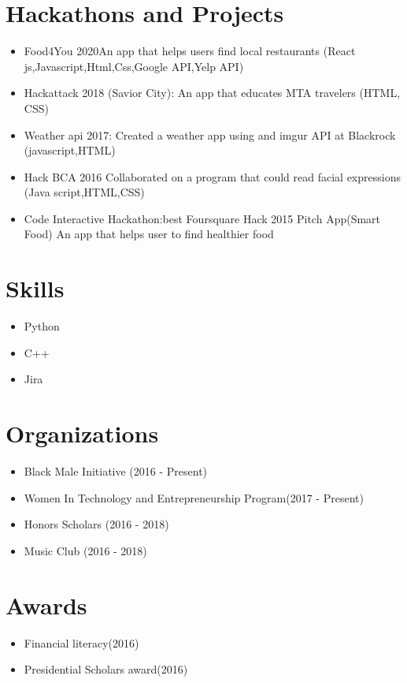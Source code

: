 \documentclass{article}
\begin{document}
\section{Hackathons and Projects}
\begin{itemize}
\item{ Food4You 2020}An app that helps users find local restaurants (React js,Javascript,Html,Css,Google API,Yelp API) 
\item {Hackattack 2018} {(Savior City): An app that educates MTA travelers (HTML, CSS)}
\item {Weather api 2017}: Created a weather app using and imgur API at Blackrock (javascript,HTML)
\item {Hack BCA 2016} {Collaborated on a program that could read facial expressions (Java script,HTML,CSS) } 
\item {Code Interactive Hackathon:best Foursquare Hack 2015}
 {Pitch App(Smart Food) An app that helps user to find healthier food} 
\end{itemize}

 \section{ Skills}
\begin{itemize}
\item{}Python    
\item C++ 
\item Jira 
\end{itemize}
\section{Organizations}
\begin{itemize}
\item Black Male Initiative (2016 - Present)
\item Women In Technology and Entrepreneurship Program(2017 - Present)
\item Honors Scholars (2016 - 2018)
\item  Music Club (2016 - 2018)
\end{itemize}

\section{Awards}
\begin{itemize}
\item Financial literacy(2016)
\item Presidential Scholars award(2016)
\end{itemize}
\end{document}
